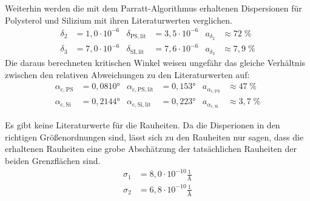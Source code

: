     Weiterhin werden die mit dem Parratt-Algorithmus erhaltenen Dispersionen für Polysterol und Silizium mit ihren Literaturwerten verglichen.
    \begin{align*}
        \delta_2 &= 1,0 \cdot 10^{-6} & \delta_{\mathrm{PS,lit}} &= 3,5 \cdot 10^{-6} & a_{\delta_2} &\approx 72\;\%\\
        \delta_3 &= 7,0 \cdot 10^{-6} & \delta_{\mathrm{SI,lit}} &= 7,6 \cdot 10^{-6} & a_{\delta_3} &\approx 7,9\;\%
    \end{align*}
    Die daraus berechneten kritischen Winkel weisen ungefähr das gleiche Verhältnis zwischen den relativen Abweichungen zu den Literaturwerten auf:
    \begin{align*}
        \alpha_{\mathrm{c,PS}} &= 0,0810° & \alpha_{\mathrm{c,PS,lit}} &= 0,153° & a_{\alpha_{\mathrm{c,PS}}} &\approx 47\;\%\\
        \alpha_{\mathrm{c,Si}} &= 0,2144° & \alpha_{\mathrm{c,Si,lit}} &= 0,223° & a_{\alpha_{\mathrm{c,Si}}} &\approx 3,7\;\%
    \end{align*}

    Es gibt keine Literaturwerte für die Rauheiten. Da die Disperionen in den richtigen Größenordnungen sind, lässt sich zu den Rauheiten nur sagen, dass die erhaltenen Rauheiten eine grobe Abschätzung der tatsächlichen Rauheiten der beiden Grenzflächen sind.
    \begin{align*}
        \sigma_1 &= 8,0 \cdot 10^{-10} \frac{1}{\text{\AA}}\\[2pt]
        \sigma_2 &= 6,8 \cdot 10^{-10} \frac{1}{\text{\AA}}
    \end{align*}

